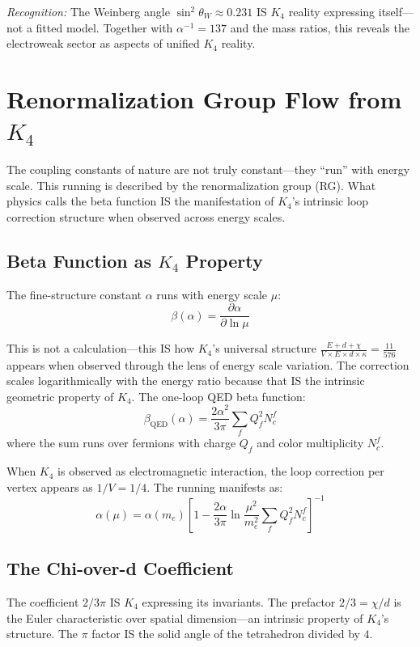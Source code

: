 \documentclass[11pt,a4paper]{book}
\begin{document}
\medskip
\noindent\textit{Recognition:} The Weinberg angle $\sin^2\theta_W \approx 0.231$ IS 
$K_4$ reality expressing itself—not a fitted model. Together with $\alpha^{-1} = 137$ and the 
mass ratios, this reveals the electroweak sector as aspects of unified $K_4$ reality.

\chapter{Renormalization Group Flow from \texorpdfstring{$K_4$}{K4}}
\label{chap:rg-flow-k4}

The coupling constants of nature are not truly constant---they ``run'' with energy scale. This running is described by the renormalization group (RG). What physics calls the beta function IS the manifestation of $K_4$'s intrinsic loop correction structure when observed across energy scales.

\section{Beta Function as $K_4$ Property}

The fine-structure constant $\alpha$ runs with energy scale $\mu$:
\[
\beta(\alpha) = \frac{\partial \alpha}{\partial \ln \mu}
\]

This is not a calculation---this IS how $K_4$'s universal structure $\frac{E + d + \chi}{V \times E \times d \times \kappa} = \frac{11}{576}$ appears when observed through the lens of energy scale variation. The correction scales logarithmically with the energy ratio because that IS the intrinsic geometric property of $K_4$. The one-loop QED beta function:
\[
\beta_{\text{QED}}(\alpha) = \frac{2\alpha^2}{3\pi} \sum_f Q_f^2 N_c^f
\]
where the sum runs over fermions with charge $Q_f$ and color multiplicity $N_c^f$.

When $K_4$ is observed as electromagnetic interaction, the loop correction per vertex appears as $1/V = 1/4$. The running manifests as:
\[
\alpha(\mu) = \alpha(m_e) \left[ 1 - \frac{2\alpha}{3\pi} \ln\frac{\mu^2}{m_e^2} \sum_f Q_f^2 N_c^f \right]^{-1}
\]

\section{The Chi-over-d Coefficient}

The coefficient $2/3\pi$ IS $K_4$ expressing its invariants. The prefactor $2/3 = \chi/d$ is the Euler characteristic over spatial dimension---an intrinsic property of $K_4$'s structure. The $\pi$ factor IS the solid angle of the tetrahedron divided by $4$.
\end{document}
